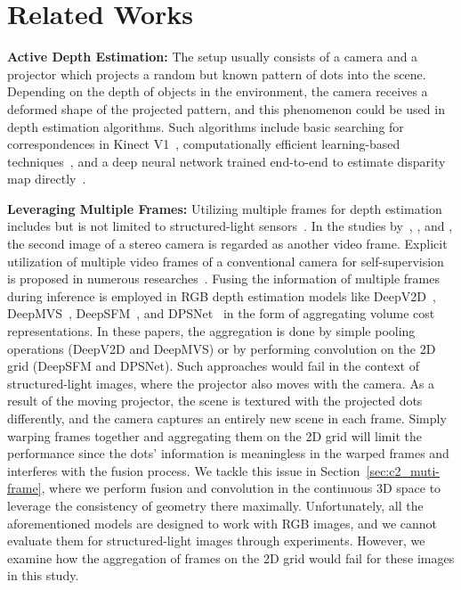 \section{Related Works} \label{sec:c2_related_work}

\noindent\textbf{Active Depth Estimation:} The setup usually consists of a camera and a projector which projects a random but known pattern of dots into the scene. Depending on the depth of objects in the environment, the camera receives a deformed shape of the projected pattern, and this phenomenon could be used in depth estimation algorithms. Such algorithms include basic searching for correspondences in Kinect V1~\citep{martinez2013kinect}, computationally efficient learning-based techniques~\citep{fanello2017ultrastereo, ryan2016hyperdepth, chen2014fast}, and a deep neural network trained end-to-end to estimate disparity map directly~\citep{zhang2018activestereonet, kleitsiotis2019color, riegler2019connecting}.

\bigbreak\noindent\textbf{Leveraging Multiple Frames:} Utilizing multiple frames for depth estimation includes but is not limited to structured-light sensors~\citep{riegler2019connecting}. In the studies by~\cite{godard2017unsupervised}, \cite{xie2016deep3d}, and \cite{kuznietsov2017semi}, the second image of a stereo camera is regarded as another video frame. Explicit utilization of multiple video frames of a conventional camera for self-supervision is proposed in numerous researches~\citep{zhan2018unsupervised, zhou2017unsupervised, bian2019unsupervised, godard2019digging, guizilini20203d, pillai2019superdepth, casser2019unsupervised}. Fusing the information of multiple frames during inference is employed in RGB depth estimation models like
DeepV2D~\citep{teed2019deepv2d}, DeepMVS~\citep{huang2018deepmvs}, DeepSFM~\citep{wei2020deepsfm}, and DPSNet~\citep{im2018dpsnet} in the form of aggregating volume cost representations. In these papers, the aggregation is done by simple pooling operations (DeepV2D and DeepMVS) or by performing convolution on the 2D grid (DeepSFM and DPSNet). Such approaches would fail in the context of structured-light images, where the projector also moves with the camera. As a result of the moving projector, the scene is textured with the projected dots differently, and the camera captures an entirely new scene in each frame. Simply warping frames together and aggregating them on the 2D grid will limit the performance since the dots' information is meaningless in the warped frames and interferes with the fusion process. We tackle this issue in Section~\ref{sec:c2_muti-frame}, where we perform fusion and convolution in the continuous 3D space to leverage the consistency of geometry there maximally. Unfortunately, all the aforementioned models are designed to work with RGB images, and we cannot evaluate them for structured-light images through experiments. However, we examine how the aggregation of frames on the 2D grid would fail for these images in this study.

